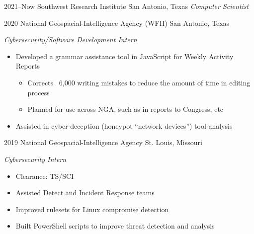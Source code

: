 \documentclass[]{friggeri-cv} %
\begin{document}
\begin{entrylist}

	\entry
	{2021--Now}
	{Southwest Research Institute}
	{San Antonio, Texas}
	{\emph{Computer Scientist}
	}
\vspace{-5pt}

\entry
{2020}
{National Geospacial-Intelligence Agency (WFH)}
{San Antonio, Texas}
{\emph{Cybersecurity/Software Development Intern}
	\begin{itemize}
		\item Developed a grammar assistance tool in JavaScript for Weekly Activity Reports
		\begin{itemize}
			\item Corrects ~6,000 writing mistakes to reduce the amount of time in editing process 
			\item Planned for use across NGA, such as in reports to Congress, etc 
		\end{itemize}
		\item Assisted in cyber-deception (honeypot ``network devices'') tool analysis
	\end{itemize}
}
\vspace{-5pt}

	
	\entry
	{2019}
	{National Geospacial-Intelligence Agency}
	{St. Louis, Missouri}
	{\emph{Cybersecurity Intern}
		\begin{itemize}
			\item Clearance: TS/SCI
			\item Assisted Detect and Incident Response teams
			\item Improved rulesets for Linux compromise detection
			\item Built PowerShell scripts to improve threat detection and analysis
		\end{itemize}
	}
\vspace{-5pt}
	

\end{entrylist}
\end{document}
